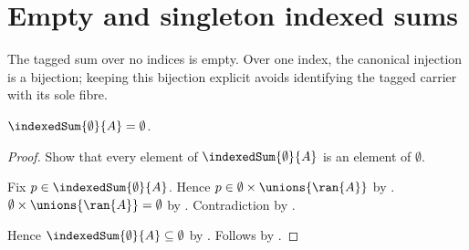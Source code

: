 \section{Empty and singleton indexed sums}



The tagged sum over no indices is empty.  Over one index, the canonical
injection is a bijection; keeping this bijection explicit avoids identifying
the tagged carrier with its sole fibre.

\begin{proposition}\label{empty_indexed_sum}
    $\indexedSum{\emptyset}{A}=\emptyset$.
\end{proposition}
\begin{proof}
    Show that every element of $\indexedSum{\emptyset}{A}$ is an element of
        $\emptyset$.
    \begin{subproof}
        Fix $p\in\indexedSum{\emptyset}{A}$.
        Hence $p\in\emptyset\times\unions{\ran{A}}$ by
            .
        $\emptyset\times\unions{\ran{A}}=\emptyset$ by
            .
        Contradiction by .
    \end{subproof}
    Hence $\indexedSum{\emptyset}{A}\subseteq\emptyset$ by
        .
    Follows by .
\end{proof}

